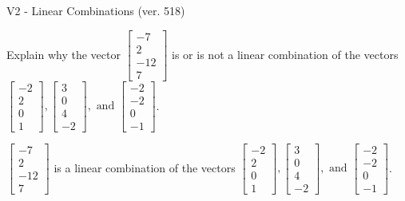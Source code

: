 \begin{exercise}
  \begin{exerciseTitle}V2 - Linear Combinations (ver. 518)\end{exerciseTitle}
  \begin{exerciseStatement}
    Explain why the vector \(\left[\begin{array}{c}
-7 \\
2 \\
-12 \\
7
\end{array}\right]\)  is or is not a linear 
	combination of the vectors \(\left[\begin{array}{c}
-2 \\
2 \\
0 \\
1
\end{array}\right] , \left[\begin{array}{c}
3 \\
0 \\
4 \\
-2
\end{array}\right] , \text{ and } \left[\begin{array}{c}
-2 \\
-2 \\
0 \\
-1
\end{array}\right]\).
	


  \end{exerciseStatement}
  \begin{exerciseAnswer}
   \(\left[\begin{array}{c}
-7 \\
2 \\
-12 \\
7
\end{array}\right]\) 
  	 is  
	a linear combination of the vectors \(\left[\begin{array}{c}
-2 \\
2 \\
0 \\
1
\end{array}\right] , \left[\begin{array}{c}
3 \\
0 \\
4 \\
-2
\end{array}\right] , \text{ and } \left[\begin{array}{c}
-2 \\
-2 \\
0 \\
-1
\end{array}\right]\).

	
  


  \end{exerciseAnswer}
\end{exercise}